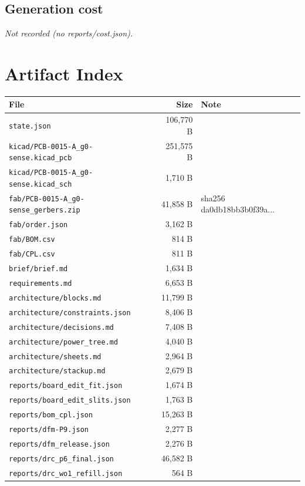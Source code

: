 \documentclass[11pt,a4paper]{article}
\begin{document}
\subsection*{Generation cost}
\emph{Not recorded (no reports/cost.json).}
\section{Artifact Index}
{\small
\begin{longtable}{p{9cm}rp{4cm}}
\toprule
\textbf{File} & \textbf{Size} & \textbf{Note} \\
\midrule
\endhead
\texttt{state.json} & 106,770 B &  \\
\texttt{kicad/PCB-0015-A\_g0-sense.kicad\_pcb} & 251,575 B &  \\
\texttt{kicad/PCB-0015-A\_g0-sense.kicad\_sch} & 1,710 B &  \\
\texttt{fab/PCB-0015-A\_g0-sense\_gerbers.zip} & 41,858 B & sha256 da0db18bb3b0f39a... \\
\texttt{fab/order.json} & 3,162 B &  \\
\texttt{fab/BOM.csv} & 814 B &  \\
\texttt{fab/CPL.csv} & 811 B &  \\
\texttt{brief/brief.md} & 1,634 B &  \\
\texttt{requirements.md} & 6,653 B &  \\
\texttt{architecture/blocks.md} & 11,799 B &  \\
\texttt{architecture/constraints.json} & 8,406 B &  \\
\texttt{architecture/decisions.md} & 7,408 B &  \\
\texttt{architecture/power\_tree.md} & 4,040 B &  \\
\texttt{architecture/sheets.md} & 2,964 B &  \\
\texttt{architecture/stackup.md} & 2,679 B &  \\
\texttt{reports/board\_edit\_fit.json} & 1,674 B &  \\
\texttt{reports/board\_edit\_slits.json} & 1,763 B &  \\
\texttt{reports/bom\_cpl.json} & 15,263 B &  \\
\texttt{reports/dfm-P9.json} & 2,277 B &  \\
\texttt{reports/dfm\_release.json} & 2,276 B &  \\
\texttt{reports/drc\_p6\_final.json} & 46,582 B &  \\
\texttt{reports/drc\_wo1\_refill.json} & 564 B &  \\

\end{longtable}}
\end{document}
